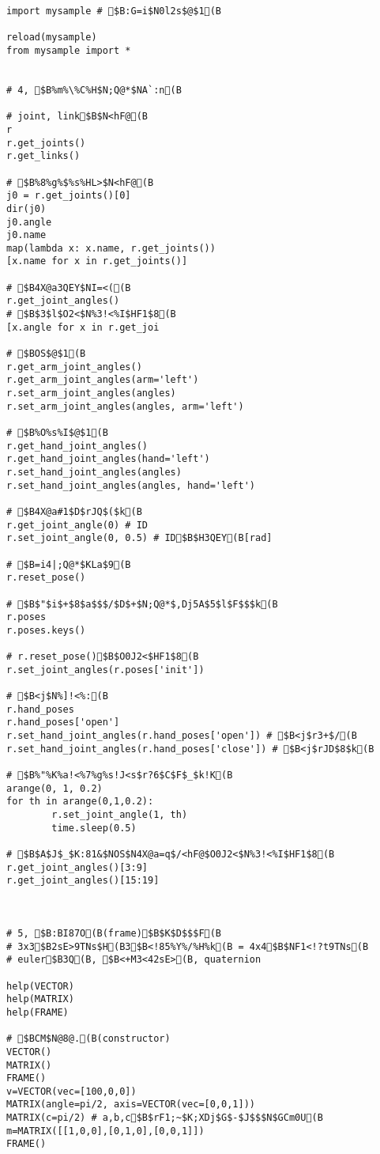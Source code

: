 \documentclass[11pt]{jreport}
\begin{document}
{{{{{{{{{{{{{{{\begin{verbatim}
import mysample # $B:G=i$N0l2s$@$1(B

reload(mysample)
from mysample import *


# 4, $B%m%\%C%H$N;Q@*$NA`:n(B

# joint, link$B$N<hF@(B
r
r.get_joints()
r.get_links()

# $B%8%g%$%s%HL>$N<hF@(B
j0 = r.get_joints()[0]
dir(j0)
j0.angle
j0.name
map(lambda x: x.name, r.get_joints())
[x.name for x in r.get_joints()]

# $B4X@a3QEY$NI=<((B
r.get_joint_angles()
# $B$3$l$O2<$N%3!<%I$HF1$8(B
[x.angle for x in r.get_joi

# $BOS$@$1(B
r.get_arm_joint_angles()
r.get_arm_joint_angles(arm='left')
r.set_arm_joint_angles(angles)
r.set_arm_joint_angles(angles, arm='left')

# $B%O%s%I$@$1(B
r.get_hand_joint_angles()
r.get_hand_joint_angles(hand='left')
r.set_hand_joint_angles(angles)
r.set_hand_joint_angles(angles, hand='left')

# $B4X@a#1$D$rJQ$($k(B
r.get_joint_angle(0) # ID
r.set_joint_angle(0, 0.5) # ID$B$H3QEY(B[rad]

# $B=i4|;Q@*$KLa$9(B
r.reset_pose()

# $B$"$i$+$8$a$$$/$D$+$N;Q@*$,Dj5A$5$l$F$$$k(B
r.poses
r.poses.keys()

# r.reset_pose()$B$O0J2<$HF1$8(B
r.set_joint_angles(r.poses['init'])

# $B<j$N%]!<%:(B
r.hand_poses
r.hand_poses['open']
r.set_hand_joint_angles(r.hand_poses['open']) # $B<j$r3+$/(B
r.set_hand_joint_angles(r.hand_poses['close']) # $B<j$rJD$8$k(B

# $B%"%K%a!<%7%g%s!J<s$r?6$C$F$_$k!K(B
arange(0, 1, 0.2)
for th in arange(0,1,0.2):
        r.set_joint_angle(1, th)
        time.sleep(0.5)

# $B$A$J$_$K:81&$NOS$N4X@a=q$/<hF@$O0J2<$N%3!<%I$HF1$8(B
r.get_joint_angles()[3:9]
r.get_joint_angles()[15:19]



# 5, $B:BI87O(B(frame)$B$K$D$$$F(B
# 3x3$B2sE>9TNs$H(B3$B<!85%Y%/%H%k(B = 4x4$B$NF1<!?t9TNs(B
# euler$B3Q(B, $B<+M3<42sE>(B, quaternion

help(VECTOR)
help(MATRIX)
help(FRAME)

# $BCM$N@8@.(B(constructor)
VECTOR()
MATRIX()
FRAME()
v=VECTOR(vec=[100,0,0])
MATRIX(angle=pi/2, axis=VECTOR(vec=[0,0,1]))
MATRIX(c=pi/2) # a,b,c$B$rF1;~$K;XDj$G$-$J$$$N$GCm0U(B
m=MATRIX([[1,0,0],[0,1,0],[0,0,1]])
FRAME()


\end{verbatim}}}}}}}}}}}}}}}}
\end{document}

